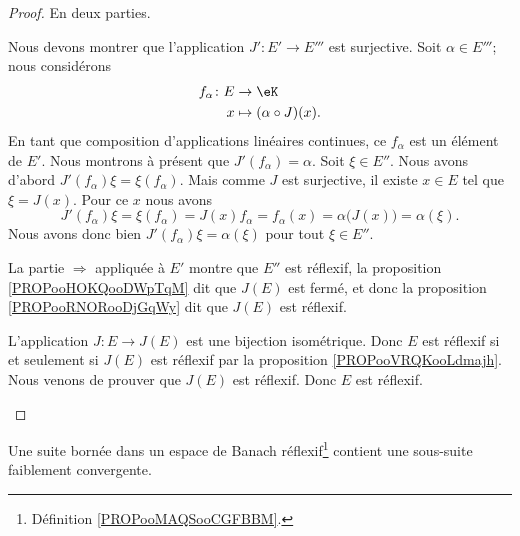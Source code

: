 \begin{proof}
	En deux parties.
	\begin{subproof}
		\spitem[\( \Rightarrow\)]
		Nous devons montrer que l'application \(J' \colon E'\to E'''  \) est surjective. Soit \( \alpha\in E'''\); nous considérons
		\begin{equation}
			\begin{aligned}
				f_{\alpha}\colon E & \to \eK                     \\
				x                  & \mapsto (\alpha\circ J)(x).
			\end{aligned}
		\end{equation}
		En tant que composition d'applications linéaires continues, ce \( f_{\alpha}\) est un élément de \( E'\). Nous montrons à présent que \( J'(f_{\alpha})=\alpha\). Soit \( \xi\in E''\). Nous avons d'abord \( J'(f_{\alpha})\xi=\xi(f_{\alpha})\). Mais comme \( J\) est surjective, il existe \( x\in E\) tel que \( \xi=J(x)\). Pour ce \( x\) nous avons
		\begin{equation}
			J'(f_{\alpha})\xi=\xi(f_{\alpha})=J(x)f_{\alpha}=f_{\alpha}(x)=\alpha\big( J(x) \big)=\alpha(\xi).
		\end{equation}
		Nous avons donc bien \( J'(f_{\alpha})\xi=\alpha(\xi)\) pour tout \( \xi\in E''\).

		\spitem[\( \Leftarrow\)]
		La partie \( \Rightarrow\) appliquée à \( E'\) montre que \( E''\) est réflexif, la proposition \ref{PROPooHOKQooDWpTqM} dit que \( J(E)\) est fermé, et donc la proposition \ref{PROPooRNORooDjGqWy} dit que \( J(E)\) est réflexif.

		L'application \(J \colon E\to J(E)  \) est une bijection isométrique. Donc \( E\) est réflexif si et seulement si \( J(E)\) est réflexif par la proposition \ref{PROPooVRQKooLdmajh}. Nous venons de prouver que \( J(E)\) est réflexif. Donc \( E\) est réflexif.
	\end{subproof}
\end{proof}

\begin{proposition}       \label{PROPooPVVYooMZjQSq}
	Une suite bornée dans un espace de Banach réflexif\footnote{Définition \ref{PROPooMAQSooCGFBBM}.} contient une sous-suite faiblement convergente.
\end{proposition}

